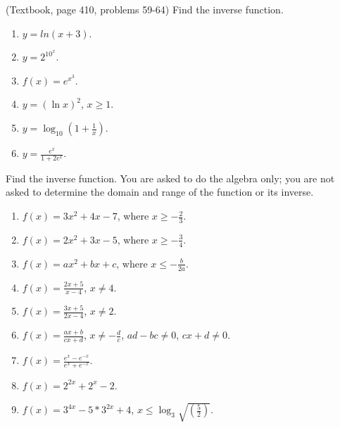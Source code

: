 \begin{problem} (Textbook, page 410, problems 59-64)
Find the inverse function. 
\begin{multicols}{2}
\begin{enumerate}
\item $y=ln (x+3)$.
\item $y=2^{10^x}$.
\item $f(x)=e^{x^3}$.
\item $y=(\ln x)^2$, $x\geq 1$.
\item $y=\log_{10}\left(1+\frac{1}{x} \right)$.
\item $y=\frac{e^x}{1+2e^x}$.
\end{enumerate}
\end{multicols}
\end{problem}
\begin{problem}
Find the inverse function. You are asked to do the algebra only; you are not asked to determine the domain and range of the function or its inverse. 
\begin{multicols}{2}
\begin{enumerate}
\item $f(x)= 3x^2+4x-7$, where $x\geq -\frac{2}{3}$.
\item $f(x)= 2x^2+3x-5$, where $x\geq -\frac{3}{4}$.
\item $f(x)=ax^2+bx+c$, where $x\leq -\frac{b}{2a}$.
\item $f(x)= \frac{2x+5}{x-4}$, $x\neq 4$.
\item $f(x)= \frac{3x+5}{2x-4}$, $x\neq 2$.
\item $f(x)=\frac{ax+b}{cx+d}$, $x\neq -\frac{d}c$, $ad-bc\neq 0$, $cx+d\neq 0$.
\item $f(x)=\frac{e^x- e^{-x}}{e^x+e^{-x}}$.
\item $f(x)=2^{2x}+2^{x}-2$.
\item $f(x)=3^{4x}- 5* 3^{2x}+4$, $x\leq \log_{3}\sqrt{\left(\frac{5}{2}\right)}$.
\end{enumerate}
\end{multicols}
\end{problem}
